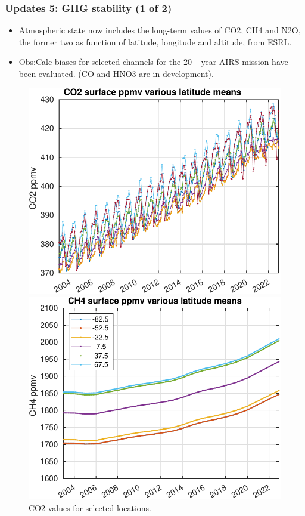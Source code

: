 \documentclass[10pt,t]{beamer}
\begin{document}
\begin{frame}
\end{frame}

\begin{frame}
  \frametitle{Updates 5: GHG stability (1 of 2)}
  \begin{itemize}
    \item Atmospheric state now includes the long-term values of CO2, CH4 and N2O,
    the former two as function of latitude, longitude and altitude, from ESRL.
    \item Obs:Calc biases for selected channels for the 20+ year AIRS mission have been
    evaluated. (CO and HNO3 are in development).
  \end{itemize}
  
\begin{figure}
  \begin{minipage}[c]{0.3\linewidth}
    \includegraphics[width=\linewidth]{./Figs/co2_ppmv_trend_zonal.pdf}
    \caption{CO2 values for selected locations.}
  \end{minipage}
\hfill
  \begin{minipage}[c]{0.3\linewidth}
    \includegraphics[width=\linewidth]{./Figs/ch4_ppmv_trend_zonal.pdf}

\end{minipage}
\end{figure}
\end{frame}
\end{document}
